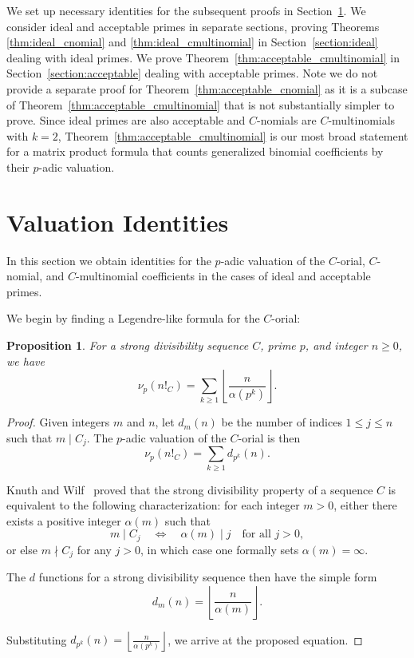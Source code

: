 \documentclass{amsart}
\newtheorem{proposition}[theorem]{Proposition}
\theoremstyle{definition}
\begin{document}
We set up necessary identities for the subsequent proofs in Section~\ref{section:valuationidentites}. We consider ideal and acceptable primes in separate sections, proving Theorems \ref{thm:ideal_cnomial} and \ref{thm:ideal_cmultinomial} in Section~\ref{section:ideal} dealing with ideal primes. We prove Theorem~\ref{thm:acceptable_cmultinomial} in Section~\ref{section:acceptable} dealing with acceptable primes. Note we do not provide a separate proof for Theorem~\ref{thm:acceptable_cnomial} as it is a subcase of Theorem~\ref{thm:acceptable_cmultinomial} that is not substantially simpler to prove. 
Since ideal primes are also acceptable and $C$-nomials are $C$-multinomials with $k=2$, Theorem~\ref{thm:acceptable_cmultinomial} is our most broad statement for a matrix product formula that counts generalized binomial coefficients by their $p$-adic valuation.

\section{Valuation Identities}\label{section:valuationidentites}
In this section we obtain identities for the $p$-adic valuation of the $C$-orial, $C$-nomial, and $C$-multinomial coefficients in the cases of ideal and acceptable primes.

We begin by finding a Legendre-like formula for the $C$-orial:
\begin{proposition}\label{prop:Corial}
For a strong divisibility sequence $C$, prime $p$, and integer $n\geq0$, we have
    \begin{equation*} 
    \nu_p(n!_C) = \sum_{k \geq 1} \left\lfloor \frac{n}{\alpha(p^k)} \right\rfloor.
    \end{equation*} 
\end{proposition}

\begin{proof}
Given integers $m$ and $n$, let $d_m(n)$ be the number of indices $1 \leq j \leq n$ such that $m \mid C_j.$
The $ p $-adic valuation of the $C$-orial is then
\[
\nu_p(n!_C) = \sum_{k \geq 1} d_{p^k}(n).
\]

Knuth and Wilf~\cite{KnuthWilf1989} proved that the strong divisibility property of a sequence $C$ is equivalent to the following characterization: for each integer $ m > 0 $, either there exists a positive integer $ \alpha(m) $ such that
\[
m \mid C_j \quad \Longleftrightarrow \quad \alpha(m) \mid j \quad \text{for all } j > 0,
\]
or else $ m \nmid C_j $ for any $ j > 0 $, in which case one formally sets $ \alpha(m) = \infty $. 

The $d$ functions for a strong divisibility sequence then have the simple form $$d_m(n) = \left\lfloor\frac{n}{\alpha(m)}\right\rfloor.$$

Substituting $ d_{p^k}(n) = \left\lfloor \frac{n}{\alpha(p^k)} \right\rfloor $, we arrive at the proposed equation.
\end{proof}
\end{document}
